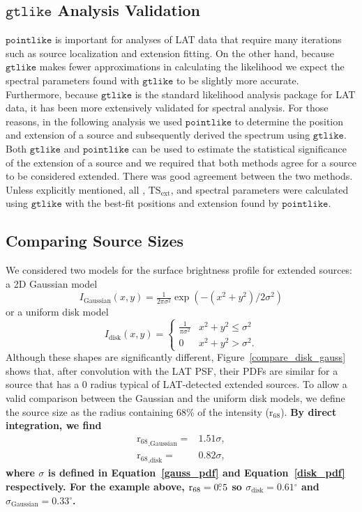 \documentclass[12pt,preprint]{aastex}
\newcommand{\tsext}{{\ensuremath{\text{TS}_{\text{ext}}}}\xspace}
\newcommand{\rsixeight}{{\ensuremath{\text{r}_{68}}}\xspace}
\newcommand{\ts}{\text{TS}\xspace}
\newcommand{\gtlike}{\ensuremath{\mathtt{gtlike}}\xspace}
\newcommand{\pointlike}{\ensuremath{\mathtt{pointlike}}\xspace}
\newcommand{\degree}{\ensuremath{^\circ}\xspace}
\newcommand{\newtext}[1]{{\bfseries \color{red}#1}}
\begin{document}
\subsection{\gtlike Analysis Validation}
\label{gtlike_crosscheck}

\pointlike is important for analyses of LAT data that require many iterations
such as source localization and extension fitting.  On the other hand,
because \gtlike makes fewer approximations in calculating the likelihood
we expect the spectral parameters found with \gtlike to be slightly more
accurate.  Furthermore, because \gtlike is the 
standard likelihood analysis package for LAT data, 
it has been more extensively validated for spectral analysis.
For those reasons, in the following analysis we used \pointlike to
determine the position and extension of a source and subsequently derived
the spectrum using \gtlike. Both \gtlike and \pointlike can be used to
estimate the statistical significance of the extension of a source and we
required that both methods agree for a source to be considered extended.
There was good agreement between the two methods.  Unless explicitly
mentioned, all \ts, \tsext, and spectral parameters were calculated using
\gtlike with the best-fit positions and extension found by \pointlike.


\subsection{Comparing Source Sizes}

\label{compare_source_size}

We considered two models for the
surface brightness profile for extended sources: a 2D Gaussian model
\begin{equation}\label{gauss_pdf}
  I_\text{Gaussian}(x,y)=\tfrac{1}{2\pi\sigma^2}\exp\left(-(x^2+y^2)/2\sigma^2\right)
\end{equation}
or a uniform disk model
\begin{equation}\label{disk_pdf}
  I_\text{disk}(x,y)=
  \begin{cases}
    \frac{1}{\pi\sigma^2} & x^2+y^2\le\sigma^2 \\
    0                      & x^2+y^2>\sigma^2.
  \end{cases}
\end{equation}
Although these shapes are significantly different,
Figure~\ref{compare_disk_gauss} shows that, after convolution with the
LAT PSF, their PDFs are similar for a source that has a 0 radius
typical of LAT-detected extended sources.  To allow a valid comparison
between the Gaussian and the uniform disk models,
we define the source size as the radius containing 68\% of the
intensity ($\rsixeight$). \newtext{
By direct integration, we find
\begin{align}
\rsixeight_\text{,Gaussian}=&1.51\sigma, \\
\rsixeight_\text{,disk}=&0.82\sigma, 
\end{align}
where $\sigma$ is defined
in Equation~\ref{gauss_pdf} and Equation~\ref{disk_pdf} respectively.
For the example above, $\rsixeight=0\fdg5$ so $\sigma_\text{disk}=0.61\degree$
and $\sigma_\text{Gaussian}=0.33\degree$.}
\end{document}
